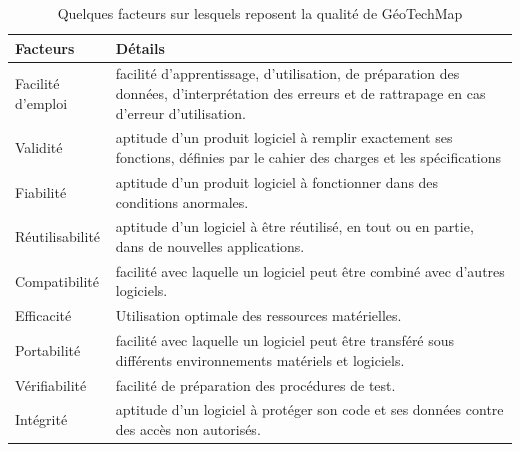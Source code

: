 \par    
\begin{table}
        \centering
        \begin{tabular}{|p{0.20\linewidth}|p{0.80\linewidth}|}
        \hline
                \textbf{Facteurs} & \textbf{Détails} \\
                \hline
                Facilité d'emploi &
                facilité d'apprentissage, d'utilisation, de préparation des données, 
                d'interprétation des erreurs et de rattrapage en cas d'erreur d'utilisation.
                         \\
                \hline
                Validité&
                aptitude d'un produit logiciel à remplir exactement ses fonctions, 
                définies par le cahier des charges et les spécifications
                    \\
                \hline
                Fiabilité &
                aptitude d'un produit logiciel à fonctionner dans des conditions anormales.
                    \\
                \hline
                Réutilisabilité&
                aptitude d'un logiciel à être réutilisé, en tout ou en partie, dans de nouvelles applications.
                    \\
                \hline
                Compatibilité&
                facilité avec laquelle un logiciel peut être combiné avec d'autres logiciels.
                        \\
                \hline
                Efficacité&
                Utilisation optimale des ressources matérielles.
                        \\
                \hline
                Portabilité&
                facilité avec laquelle un logiciel peut être transféré sous différents environnements matériels et logiciels.
                        \\
                \hline
                Vérifiabilité&
                facilité de préparation des procédures de test.
                        \\
                \hline 
                Intégrité&
                aptitude d'un logiciel à protéger son code et ses données contre des accès non autorisés.
                        \\

                \hline 
        \end{tabular}
        \caption{Quelques facteurs sur lesquels reposent la qualité
        de GéoTechMap \cite{audibert2009uml}} \label{tab:facteurs}
\end{table}
\par

